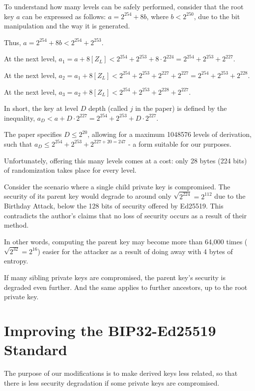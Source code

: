 \documentclass[12pt, a4paper, twocolumn]{article}
\begin{document}
To understand how many levels can be safely performed, consider that the root key $a$ can be expressed as follows: $a = 2^{254} + 8b$, where $b < 2^{250}$, due to the bit manipulation and the way it is generated. 

Thus, $a = 2^{254} + 8b < 2^{254} + 2^{253}$.

At the next level, $a_{1} = a + 8[Z_L] < 2^{254} + 2^{253} + 8 \cdot 2^{224} = 2^{254} + 2^{253} + 2^{227}$.

At the next level, $a_{2} = a_{1} + 8[Z_L] < 2^{254} + 2^{253} + 2^{227} + 2^{227} = 2^{254} + 2^{253} + 2^{228}$.

At the next level, $a_{3} = a_{2} + 8[Z_L] < 2^{254} + 2^{253} + 2^{228} + 2^{227}$.

In short, the key at level $D$ depth (called $j$ in the paper) is defined by the inequality, $a_D < a + D\cdot2^{227} = 2^{254} + 2^{253} + D\cdot2^{227}$.

The paper specifies $D \leq 2^{20}$, allowing for a maximum 1048576 levels of derivation, such that $a_{D} \leq 2^{254} + 2^{253} + 2^{227 + 20 = 247}$ - a form suitable for our purposes.

Unfortunately, offering this many levels comes at a cost: only 28 bytes (224 bits) of randomization takes place for every level. 

Consider the scenario where a single child private key is compromised. The security of its parent key would degrade to around only $\sqrt{2^{224}}=2^{112}$ due to the Birthday Attack, below the 128 bits of security offered by Ed25519. This contradicts the author's claims that no loss of security occurs as a result of their method.

In other words, computing the parent key may become more than 64,000 times ($\sqrt{2^{32}}=2^{16}$) easier for the attacker as a result of doing away with 4 bytes of entropy.

If many sibling private keys are compromised, the parent key's security is degraded even further. And the same applies to further ancestors, up to the root private key.

\section{Improving the BIP32-Ed25519 Standard}

The purpose of our modifications is to make derived keys less related, so that there is less security degradation if some private keys are compromised.
\end{document}

